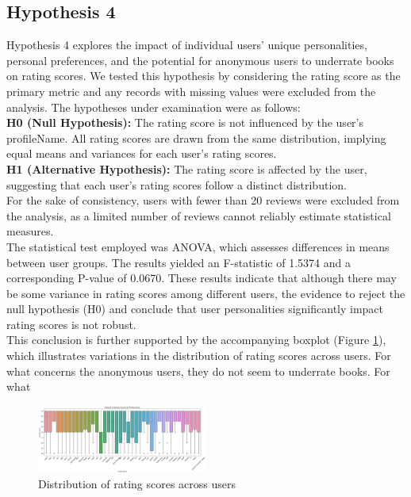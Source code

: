 \subsection*{Hypothesis 4}
Hypothesis 4 explores the impact of individual users' unique personalities, personal preferences,
and the potential for anonymous users to underrate books on rating scores.
We tested this hypothesis by considering the rating score as the primary metric and
any records with missing values were excluded from the analysis.
The hypotheses under examination were as follows:\\
\textbf{H0 (Null Hypothesis):} The rating score is not influenced by the user's profileName.
All rating scores are drawn from the same distribution, implying equal means and variances for each user's rating scores.\\
\textbf{H1 (Alternative Hypothesis):} The rating score is affected by the user,
suggesting that each user's rating scores follow a distinct distribution.\\
For the sake of consistency, users with fewer than 20 reviews were excluded from the analysis,
as a limited number of reviews cannot reliably estimate statistical measures.\\
The statistical test employed was ANOVA, which assesses differences in means between user groups.
The results yielded an F-statistic of 1.5374 and a corresponding P-value of 0.0670.
These results indicate that although there may be some variance in rating scores among different users,
the evidence to reject the null hypothesis (H0) and conclude that user personalities significantly impact
rating scores is not robust.\\
This conclusion is further supported by the accompanying boxplot (Figure \ref{fig:h4}),
which illustrates variations in the distribution of rating scores across users.
For what concerns the anonymous users, they do not seem to underrate books.
For what
\begin{figure}[H]
    \centering
    \includegraphics[width=0.5\textwidth]{./figures/h4.1.png}
    \caption{Distribution of rating scores across users}
    \label{fig:h4}
\end{figure}
